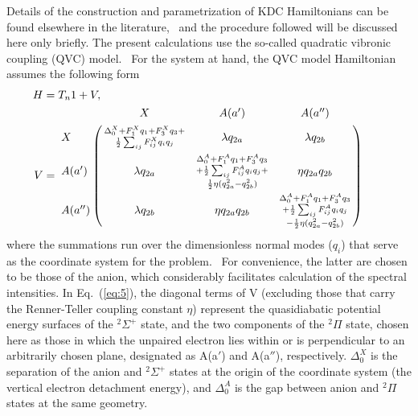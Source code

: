 \documentclass[aip,graphicx]{revtex4-1}
\begin{document}
Details of the construction and parametrization of KDC Hamiltonians can be found elsewhere in the literature,~\cite{sta21,ich06,ich08,ich09,wei17} and the procedure followed will be discussed here only briefly. The present calculations use the so-called quadratic vibronic coupling (QVC) model.~\cite{ich06} For the system at hand, the QVC model Hamiltonian  assumes the following form
\begin{align}
H &= T_n1+V,\\
V &= \bordermatrix{ & X & A(a') & A(a'') \cr
	X &\substack{\Delta_0^X+F_1^Xq_1+F_3^Xq_3+\\ 
		\frac{1}{2} \sum_{ij}F^X_{ij}q_iq_j}& \lambda q_{2a} & \lambda q_{2b} \cr
	A(a') & \lambda q_{2a} & \substack{\Delta^A_0+F^A_1q_1+F^A_3q_3\\+\frac{1}{2}\sum_{ij}F^A_{ij}q_iq_j+\\\frac{1}{2}\eta(q_{2a}^2-q_{2b}^2)} & \eta q_{2a}q_{2b} \cr
	A(a'') & \lambda q_{2b} & \eta q_{2a}q_{2b} & \substack{\Delta_0^A+F_1^Aq_1+F_3^Aq_3\\+\frac{1}{2}\sum_{ij}F_{ij}^Aq_iq_j\\-\frac{1}{2}\eta(q_{2a}^2-q_{2b}^2) } } \qquad
\label{eq:5}
\end{align}
where the summations run over the dimensionless normal modes ($q_i$) that serve as the coordinate system for the problem.~\cite{sta21,car00} For convenience, the latter are chosen to be those of the anion, which considerably facilitates calculation of the spectral intensities.  In Eq.~(\ref{eq:5}), the diagonal terms of V (excluding those that carry the Renner-Teller coupling constant $\eta$) represent the quasidiabatic potential energy surfaces of the $^2\Sigma^+$ state, and the two components of the $^2\Pi$ state, chosen here as those in which the unpaired electron lies within or is perpendicular to an arbitrarily chosen plane, designated as A(a$'$) and A(a$''$), respectively. $\Delta_0^X$ is the separation of the anion and $^2\Sigma^+$ states at the origin of the coordinate system (the vertical electron detachment energy), and $\Delta_0^{A}$ is the gap between anion and $^2\Pi$ states at the same geometry.   
\end{document}
